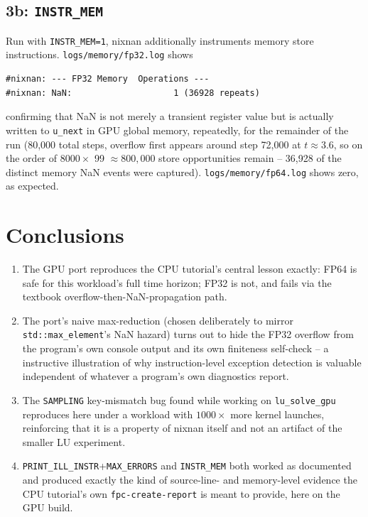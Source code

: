 \documentclass[11pt,a4paper]{article}
\begin{document}
\subsection{3b: \texttt{INSTR\_MEM}}

Run with \texttt{INSTR\_MEM=1}, nixnan additionally instruments memory
store instructions. \texttt{logs/memory/fp32.log} shows

\begin{lstlisting}
#nixnan: --- FP32 Memory  Operations ---
#nixnan: NaN:                    1 (36928 repeats)
\end{lstlisting}

\noindent confirming that NaN is not merely a transient register value but
is actually written to \texttt{u\_next} in GPU global memory, repeatedly,
for the remainder of the run (80{,}000 total steps, overflow first appears
around step 72{,}000 at $t\approx3.6$, so on the order of $8000\times$
99 $\approx 800{,}000$ store opportunities remain -- 36{,}928 of the
distinct memory NaN events were captured). \texttt{logs/memory/fp64.log}
shows zero, as expected.

\section{Conclusions}

\begin{enumerate}
  \item The GPU port reproduces the CPU tutorial's central lesson exactly:
    FP64 is safe for this workload's full time horizon; FP32 is not, and
    fails via the textbook overflow-then-NaN-propagation path.
  \item The port's naive max-reduction (chosen deliberately to mirror
    \texttt{std::max\_element}'s NaN hazard) turns out to hide the FP32
    overflow from the program's own console output and its own
    finiteness self-check -- a instructive illustration of why
    instruction-level exception detection is valuable independent of
    whatever a program's own diagnostics report.
  \item The \texttt{SAMPLING} key-mismatch bug found while working on
    \texttt{lu\_solve\_gpu} reproduces here under a workload with $1000\times$
    more kernel launches, reinforcing that it is a property of nixnan
    itself and not an artifact of the smaller LU experiment.
  \item \texttt{PRINT\_ILL\_INSTR}+\texttt{MAX\_ERRORS} and
    \texttt{INSTR\_MEM} both worked as documented and produced exactly the
    kind of source-line- and memory-level evidence the CPU tutorial's own
    \texttt{fpc-create-report} is meant to provide, here on the GPU build.
\end{enumerate}
\end{document}
